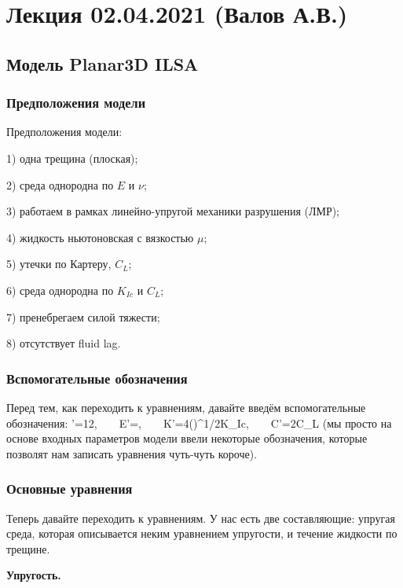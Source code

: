 \documentclass[main.tex]{subfiles}
\begin{document}

\section{Лекция 02.04.2021 (Валов А.В.)}

\subsection{Модель Planar3D ILSA}

\subsubsection{Предположения модели}

Предположения модели:

1) одна трещина (плоская);

2) среда однородна по $E$ и $\nu$;

3) работаем в рамках линейно-упругой механики разрушения (ЛМР);

4) жидкость ньютоновская с вязкостью $\mu$;

5) утечки по Картеру, $C_L$;

6) среда однородна по $K_{Ic}$ и $C_L$;

7) пренебрегаем силой тяжести;

8) отсутствует fluid lag.

\subsubsection{Вспомогательные обозначения}

Перед тем, как переходить к уравнениям, давайте введём вспомогательные обозначения:
\beq
\mu'=12\mu,\,\,\,\,\,\,\,\,\,\,
E'=,\,\,\,\,\,\,\,\,\,\,
K'=4\left(\right)^{1/2}K_{Ic},\,\,\,\,\,\,\,\,\,\,
C'=2C_L
\eeq
(мы просто на основе входных параметров модели ввели некоторые обозначения, которые позволят нам записать уравнения чуть-чуть короче).

\subsubsection{Основные уравнения}

Теперь давайте переходить к уравнениям. У нас есть две составляющие: упругая среда, которая описывается неким уравнением упругости, и течение жидкости по трещине.

\textbf{Упругость.}
\end{document}
